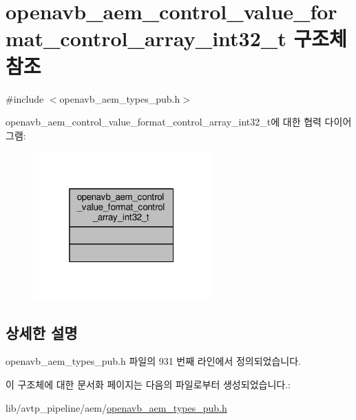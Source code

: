 \hypertarget{structopenavb__aem__control__value__format__control__array__int32__t}{}\section{openavb\+\_\+aem\+\_\+control\+\_\+value\+\_\+format\+\_\+control\+\_\+array\+\_\+int32\+\_\+t 구조체 참조}
\label{structopenavb__aem__control__value__format__control__array__int32__t}


{\ttfamily \#include $<$openavb\+\_\+aem\+\_\+types\+\_\+pub.\+h$>$}



openavb\+\_\+aem\+\_\+control\+\_\+value\+\_\+format\+\_\+control\+\_\+array\+\_\+int32\+\_\+t에 대한 협력 다이어그램\+:
\nopagebreak
\begin{figure}[H]
\begin{center}
\leavevmode
\includegraphics[width=193pt]{structopenavb__aem__control__value__format__control__array__int32__t__coll__graph}
\end{center}
\end{figure}


\subsection{상세한 설명}


openavb\+\_\+aem\+\_\+types\+\_\+pub.\+h 파일의 931 번째 라인에서 정의되었습니다.



이 구조체에 대한 문서화 페이지는 다음의 파일로부터 생성되었습니다.\+:\begin{DoxyCompactItemize}
\item 
lib/avtp\+\_\+pipeline/aem/\hyperlink{openavb__aem__types__pub_8h}{openavb\+\_\+aem\+\_\+types\+\_\+pub.\+h}\end{DoxyCompactItemize}
